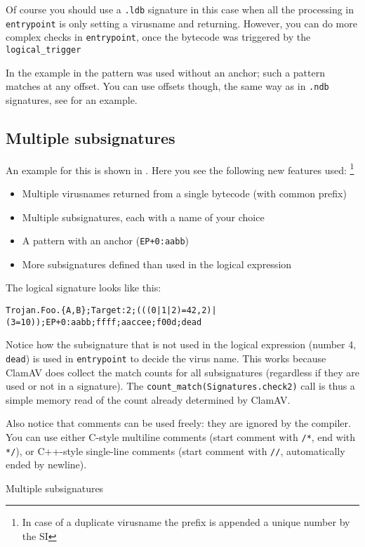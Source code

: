 Of course you should use a \verb+.ldb+ signature in this case when all the processing in \verb+entrypoint+
is only setting a virusname and returning.
However, you can do more complex checks in \verb+entrypoint+, once the bytecode was triggered by the \verb+logical_trigger+

In the example in  the pattern was used without an anchor; such a pattern matches at any offset.
You can use offsets though, the same way as in \verb+.ndb+ signatures, see  for an example.

\subsection{Multiple subsignatures}
An example for this is shown in .
Here you see the following new features used:
\footnote{In case of a duplicate virusname the
prefix is appended a unique number by the SI}
\begin{itemize}
 \item Multiple virusnames returned from a single bytecode (with common prefix) 
 \item Multiple subsignatures, each with a name of your choice
 \item A pattern with an anchor (\verb|EP+0:aabb|)
 \item More subsignatures defined than used in the logical expression
\end{itemize}

The logical signature looks like this:

\noindent
{\footnotesize
\verb/Trojan.Foo.{A,B};Target:2;(((0|1|2)=42,2)|(3=10));EP+0:aabb;ffff;aaccee;f00d;dead/
}

Notice how the subsignature that is not used in the logical expression (number 4, \verb+dead+)
is used in \verb+entrypoint+ to decide the virus name.
This works because ClamAV does collect the match counts for all subsignatures (regardless if they are used or not in
a signature). The \verb+count_match(Signatures.check2)+ call is thus a simple memory read of the count already determined by ClamAV.

Also notice that comments can be used freely: they are ignored by the compiler. You can use either C-style multiline comments
(start comment with \verb+/*+, end with \verb+*/+), or C++-style single-line comments
(start comment with \verb+//+, automatically ended by newline).

\begin{program}

\caption{Multiple subsignatures}
\label{prg:multisig}
\end{program}

